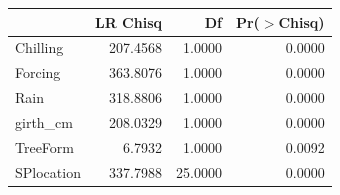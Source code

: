 \begin{table}[ht]
\centering
\begin{tabular}{lrrr}
  \hline
 & LR Chisq & Df & Pr($>$Chisq) \\ 
  \hline
Chilling & 207.4568 & 1.0000 & 0.0000 \\ 
  Forcing & 363.8076 & 1.0000 & 0.0000 \\ 
  Rain & 318.8806 & 1.0000 & 0.0000 \\ 
  girth\_cm & 208.0329 & 1.0000 & 0.0000 \\ 
  TreeForm & 6.7932 & 1.0000 & 0.0092 \\ 
  SPlocation & 337.7988 & 25.0000 & 0.0000 \\ 
   \hline
\end{tabular}
\end{table}
